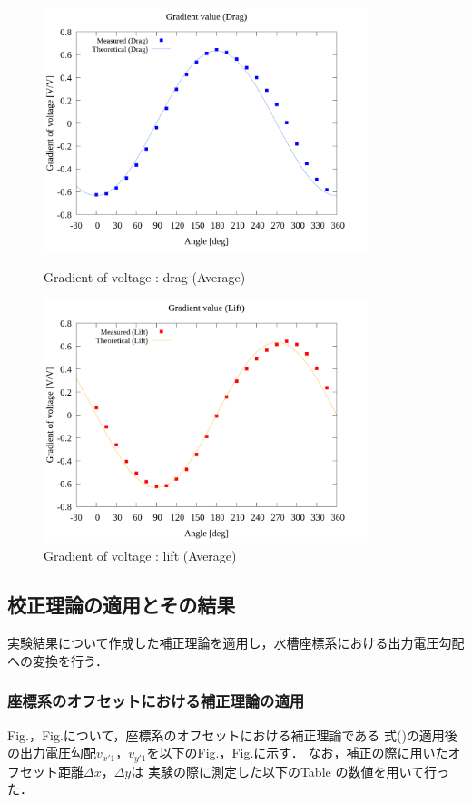 \begin{figure}[htbp]
		\centering
		\includegraphics[width=95mm]{../../02_workspace/result/2-ex/plot/21/21-1_summary_drag.png}
		\caption{Gradient of voltage : drag (Average)}
		\includegraphics[width=95mm]{../../02_workspace/result/2-ex/plot/21/21-1_summary_lift.png}
		\caption{Gradient of voltage : lift (Average)}
\end{figure}

\newpage

\subsection{校正理論の適用とその結果}
実験結果について作成した補正理論を適用し，水槽座標系における出力電圧勾配への変換を行う．

\subsubsection{座標系のオフセットにおける補正理論の適用}
Fig.，Fig.について，座標系のオフセットにおける補正理論である
式()の適用後の出力電圧勾配$v_{x'1}$，$v_{y'1}$を以下のFig.，Fig.に示す．
なお，補正の際に用いたオフセット距離$\Delta x$，$\Delta y$は
実験の際に測定した以下のTable の数値を用いて行った．

